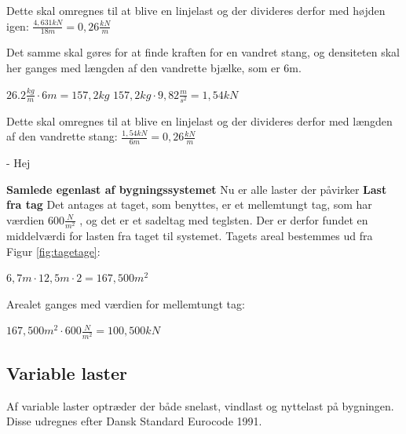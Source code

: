 Dette skal omregnes til at blive en linjelast og der divideres derfor med højden igen:
$\frac{4,\! 631 kN}{18m} = 0,\! 26\frac{kN}{m}$



Det samme skal gøres for at finde kraften for en vandret stang, og densiteten skal her ganges med længden af den vandrette bjælke, som er 6m.
\begin{center}
	$26.2\frac{kg}{m}\cdot 6m = 157,\!2 kg$
	$157,\!2 kg \cdot 9,\!82\frac{m}{s^2} = 1,\!54  kN$
\end{center}

Dette skal omregnes til at blive en linjelast og der divideres derfor med længden af den vandrette stang:
$\frac{1,\! 54 kN}{6m} = 0,\! 26\frac{kN}{m}$
\begin{center}
	\item[-] Hej
\end{center}
\textbf{Samlede egenlast af bygningssystemet}
\newline
Nu er alle laster der påvirker
\newline
\newline
\textbf{Last fra tag}
\newline
Det antages at taget, som benyttes, er et mellemtungt tag, som har værdien $600 \frac{N}{m^2}$ \citep{tag}, og det er et sadeltag med teglsten. Der er derfor fundet en middelværdi for lasten fra taget til systemet. 
\newline
\newline
Tagets areal bestemmes ud fra Figur \ref{fig:tagetage}:
\begin{center}
	$6,\!7 m\cdot 12,\!5 m \cdot 2=167,\!500 m^2$
\end{center}

Arealet ganges med værdien for mellemtungt tag:
\begin{center}
	$167,\!500 m^2\cdot 600 \frac{N}{m^2}=100,\!500 kN$
\end{center}

\subsection{Variable laster}
Af variable laster optræder der både snelast, vindlast og nyttelast på bygningen. Disse udregnes efter Dansk Standard Eurocode 1991.

